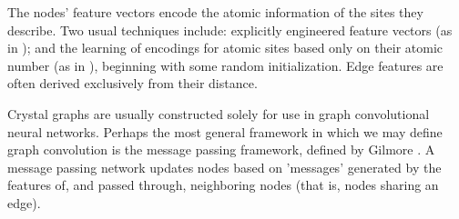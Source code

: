 \documentclass[10pt,a4paper,twocolumn]{article}
\begin{document}



The nodes' feature vectors encode the atomic information of the sites they describe. Two usual techniques include: explicitly engineered feature vectors (as in \cite{cgcnn}); and the learning of encodings for atomic sites based only on their atomic number (as in \cite{megnet}), beginning with some random initialization. Edge features are often derived exclusively from their distance.







Crystal graphs are usually constructed solely for use in graph convolutional neural networks. Perhaps the most general framework in which we may define graph convolution is the message passing framework, defined by Gilmore \cite{mpnn}.
A message passing network updates nodes based on 'messages' generated by the features of, and passed through, neighboring nodes (that is, nodes sharing an edge).%
\end{document}
